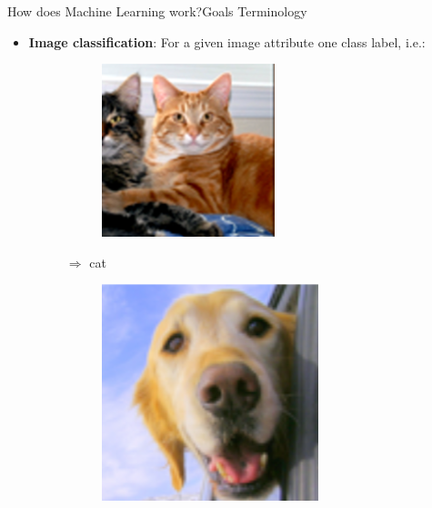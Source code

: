 \documentclass{beamer}
\begin{document}
\begin{frame}{How does Machine Learning work?}{Goals}
Terminology
\begin{itemize}
	\item \textbf{Image classification}: For a given image attribute one class label, i.e.:
	\begin{figure}[H]
		\begin{subfigure}{.1\textwidth}
			\includegraphics[width=\textwidth]{cat} 
		\end{subfigure} $\Rightarrow$ cat
		\begin{subfigure}{.1\textwidth}
			\includegraphics[width=\textwidth]{dog}

\end{subfigure}
\end{figure}
\end{itemize}
\end{frame}
\end{document}
